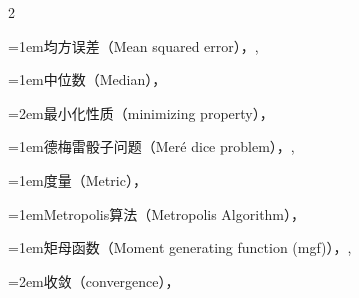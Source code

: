 \begin{multicols}{2}
\par\addvspace{2pt}
\par\noindent\hangindent=1em\hspace*{0em}\label{idx:683}均方误差（Mean squared error），\hyperref[def:7.3.1]{\pageref*{def:7.3.1}}, \hyperref[ex:7.3.28]{\pageref*{ex:7.3.28}}\par
\par\addvspace{2pt}
\par\noindent\hangindent=1em\hspace*{0em}\label{idx:684}中位数（Median），\hyperref[exercise:2.17]{\pageref*{exercise:2.17}}\par
\par\noindent\hangindent=2em\hspace*{1em}\label{idx:685}最小化性质（minimizing property），\hyperref[exercise:2.18]{\pageref*{exercise:2.18}}\par
\par\addvspace{2pt}
\par\noindent\hangindent=1em\hspace*{0em}\label{idx:686}德梅雷骰子问题（Meré dice problem），\hyperref[ex:1.3.8]{\pageref*{ex:1.3.8}}, \hyperref[ex:3.2.3]{\pageref*{ex:3.2.3}}\par
\par\addvspace{2pt}
\par\noindent\hangindent=1em\hspace*{0em}\label{idx:687}度量（Metric），\hyperref[item:12.3.b]{\pageref*{item:12.3.b}}\par
\par\addvspace{2pt}
\par\noindent\hangindent=1em\hspace*{0em}\label{idx:688}Metropolis算法（Metropolis Algorithm），\hyperref[idxocc:688:238]{\pageref*{idxocc:688:238}}\par
{}
\par\addvspace{2pt}
\par\noindent\hangindent=1em\hspace*{0em}\label{idx:689}矩母函数（Moment generating function (mgf)），\hyperref[def:2.3.6]{\pageref*{def:2.3.6}}, \hyperref[sec:2.6.3]{\pageref*{sec:2.6.3}}\par
\par\noindent\hangindent=2em\hspace*{1em}\label{idx:690}收敛（convergence），\hyperref[thm:2.3.12]{\pageref*{thm:2.3.12}}\par

\end{multicols}
